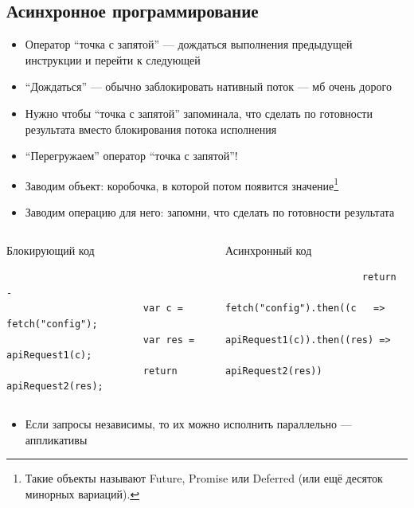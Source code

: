     \subsection{Асинхронное программирование}

    \begin{frame}[fragile]{\subsecname}
        \vspace{-0.5em}
        \begin{itemize}
            \item Оператор ``точка с запятой'' --- дождаться выполнения предыдущей инструкции и перейти к следующей
            \item ``Дождаться'' --- обычно заблокировать нативный поток --- мб очень дорого
            \item Нужно чтобы ``точка с запятой'' запоминала, что сделать по готовности результата вместо блокирования потока исполнения
            \item ``Перегружаем'' оператор ``точка с запятой''!
            \item[\then] \pause Заводим объект: коробочка, в которой потом появится значение\footnote{Такие объекты называют Future, Promise или Deferred (или ещё десяток минорных вариаций).}
            \item[\then] \pause Заводим операцию для него: запомни, что сделать по готовности результата
        \end{itemize}
        \vspace{-1.7em}
        \begin{columns}
            \begin{column}[t]{0.45\textwidth}
                \begin{block}{Блокирующий код}
                    \begin{verbatim}
                                                            -
                        var c = fetch("config");
                        var res = apiRequest1(c);
                        return apiRequest2(res);
                    \end{verbatim}
                \end{block}
            \end{column}
            \begin{column}[t]{0.45\textwidth}
                \begin{block}{Асинхронный код}
                    \begin{verbatim}
                        return
                          fetch("config").then((c   =>
                          apiRequest1(c)).then((res) =>
                          apiRequest2(res))
                    \end{verbatim}
                \end{block}
            \end{column}
        \end{columns}
        \begin{itemize}
            \item Если запросы независимы, то их можно исполнить параллельно --- аппликативы
        \end{itemize}
    \end{frame}

